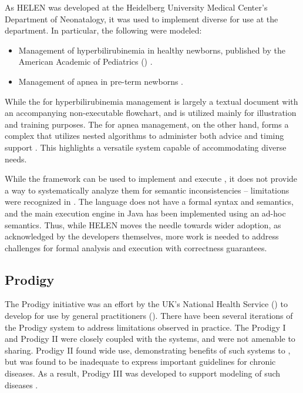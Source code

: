 As HELEN was developed at the Heidelberg University Medical Center's Department
of Neonatalogy, it was used to implement diverse \BPGs{} for use at the
department. In particular, the following \BPGs{} were modeled:
\begin{itemize}
  \item Management of hyperbilirubinemia in healthy newborns, published by the
    American Academic of Pediatrics (\AAP{}) \cite{HyperbilirubinemiaAAP94}.
  \item Management of apnea in pre-term newborns \cite{BhatiaCP00}.
\end{itemize}
While the \BPG{} for hyperbilirubinemia management is largely a textual document
with an accompanying non-executable flowchart, and is utilized mainly for
illustration and training purposes. The \BPG{} for apnea management, on the
other hand, forms a complex \CDSSs{} that utilizes nested algorithms to
administer both advice and timing support \cite{SkonetzkiMIM04}. This highlights
a versatile system capable of  accommodating diverse needs.

While the framework can be used to implement and execute \BPGs{}, it does not
provide a way to systematically analyze them for semantic inconsistencies --
limitations were recognized in \cite{SkonetzkiMIM04}. The language does not
have a formal syntax and semantics, and the main execution engine in Java
has been implemented using an ad-hoc semantics. Thus, while HELEN moves the
needle towards wider \BPG{} adoption, as acknowledged by the developers themselves,
more work is needed to address challenges for formal analysis and execution with
correctness guarantees.

\subsection{Prodigy}\label{sec:prodigy}

The Prodigy initiative was an effort by the UK's National Health Service
(\NHS{}) to develop \CDSSs{} for use by general practitioners (\GPs{}). There have
been several iterations of the Prodigy system to address limitations
observed in practice. The Prodigy I and Prodigy II were closely coupled with
the \EHR{} systems, and were not amenable to sharing. Prodigy II found wide
use, demonstrating benefits of such systems to \GPs{}, but was found to be
inadequate to express important guidelines for chronic diseases. As a result,
Prodigy III was developed to support modeling of such diseases \cite{JohnsonAMIA00}.

